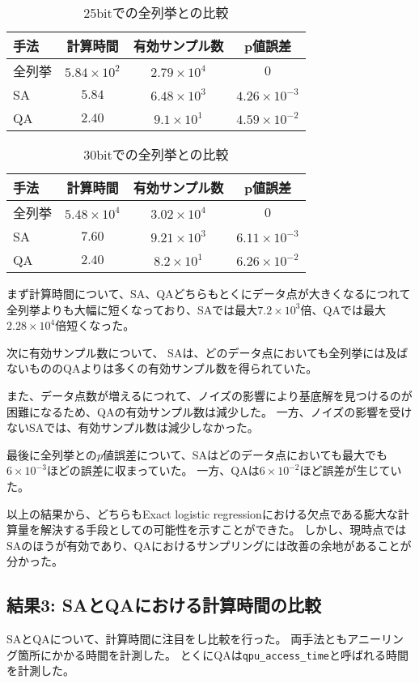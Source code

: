 \documentclass[12pt, dvipdfmx]{jmaster}
\theoremstyle{definition}
\begin{document}
\begin{table}[H]
	\caption{25bitでの全列挙との比較}
	\label{tb:25bit_time_p_diff}
	\centering
	\begin{tabular}{lccc}
		\hline
		手法& 計算時間 & 有効サンプル数 & p値誤差\\
		\hline\hline
		全列挙&$5.84 \times 10^2$ & $2.79 \times 10^4$&$0$\\
		SA  &$5.84$&$6.48 \times 10^3$&$4.26 \times 10^{-3}$\\
		QA &$2.40$&$9.1 \times 10^1$&$4.59 \times 10^{-2}$\\
		\hline
	\end{tabular}
\end{table}

\begin{table}[H]
	\caption{30bitでの全列挙との比較}
	\label{tb:30bit_time_p_diff}
	\centering
	\begin{tabular}{lccc}
		\hline
		手法& 計算時間 & 有効サンプル数 & p値誤差\\
		\hline\hline
		全列挙&$5.48 \times 10^4$ & $3.02 \times 10^4$&$0$\\
		SA  &$7.60$&$9.21 \times 10^3$&$6.11 \times 10^{-3}$\\
		QA &$2.40$&$8.2 \times 10^1$&$6.26 \times 10^{-2}$\\
		\hline
	\end{tabular}
\end{table}

まず計算時間について、SA、QAどちらもとくにデータ点が大きくなるにつれて全列挙よりも大幅に短くなっており、SAでは最大$7.2 \times 10^3$倍、QAでは最大$2.28 \times 10^4$倍短くなった。

次に有効サンプル数について、
SAは、どのデータ点においても全列挙には及ばないもののQAよりは多くの有効サンプル数を得られていた。

また、データ点数が増えるにつれて、ノイズの影響により基底解を見つけるのが困難になるため、QAの有効サンプル数は減少した。
一方、ノイズの影響を受けないSAでは、有効サンプル数は減少しなかった。

最後に全列挙との$p$値誤差について、SAはどのデータ点においても最大でも$6 \times 10^{-3}$ほどの誤差に収まっていた。
一方、QAは$6 \times 10^{-2}$ほど誤差が生じていた。

以上の結果から、どちらもExact logistic regressionにおける欠点である膨大な計算量を解決する手段としての可能性を示すことができた。
しかし、現時点ではSAのほうが有効であり、QAにおけるサンプリングには改善の余地があることが分かった。

\subsection{結果3: SAとQAにおける計算時間の比較}
\label{sec:time_SAQA}
SAとQAについて、計算時間に注目をし比較を行った。
両手法ともアニーリング箇所にかかる時間を計測した。
とくにQAは\verb*|qpu_access_time|と呼ばれる時間を計測した\cite{d-wave}。
\end{document}
